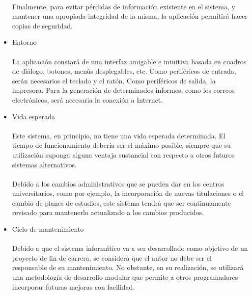 \begin{itemize}
   \paragraph{}Finalmente, para evitar pérdidas de información existente
   en el sistema, y mantener una apropiada integridad de la misma, la aplicación
   permitirá hacer copias de seguridad.

 \item Entorno

   \paragraph{}La aplicación constará de una interfaz amigable e
   intuitiva basada en cuadros de diálogo, botones, menús desplegables, etc.
   Como periféricos de entrada, serán necesarios el teclado y el ratón. Como
   periféricos de salida, la impresora. Para la generación de determinados
   informes, como los correos electrónicos, será necesaria la conexión a
   Internet.

 \item Vida esperada

   \paragraph{}Este sistema, en principio, no tiene una vida esperada
   determinada. El tiempo de funcionamiento debería ser el máximo posible,
   siempre que su utilización suponga alguna ventaja sustancial con respecto a
   otros futuros sistemas alternativos.

   \paragraph{}Debido a los cambios administrativos que se pueden dar en los
   centros universitarios, como por ejemplo, la incorporación de nuevas
   titulaciones o el cambio de planes de estudios, este sistema tendrá que ser
   continuamente revisado para mantenerlo actualizado a los cambios producidos.

 \item Ciclo de mantenimiento

   \paragraph{}Debido a que el sistema informático va a ser desarrollado como
   objetivo de un proyecto de fin de carrera, se considera que el autor no debe
   ser el responsable de su mantenimiento. No obstante, en su realización, se
   utilizará una metodología de desarrollo modular que permite a otros
   programadores incorporar futuras mejoras con facilidad.


\end{itemize}
